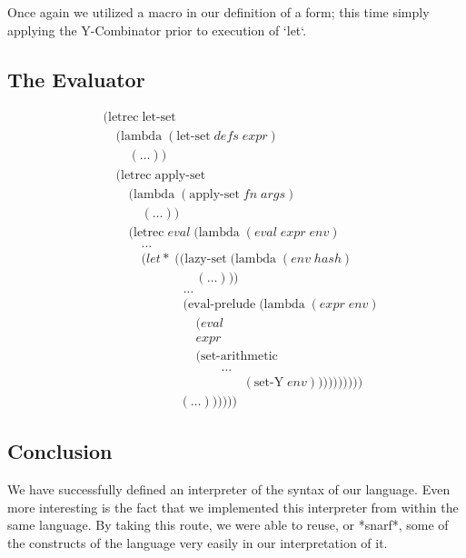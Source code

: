 Once again we utilized a macro in our definition of a form; this time simply
applying the Y-Combinator prior to execution of `let`.

\clearpage
\subsection{The Evaluator}
\begin{align*}
& (\text{letrec} \; \text{let-set} \; 
\\& \quad (\text{lambda} \; (\text{let-set} \; defs \; expr)
\\& \qquad (\dots))
\\& \quad (\text{letrec} \; \text{apply-set} \; 
\\& \qquad (\text{lambda} \; (\text{apply-set} \; fn \; args)
\\& \qquad \quad (\dots))
\\& \qquad (\text{letrec} \; eval \; (\text{lambda} \; (eval \; expr \; env)
\\& \qquad \quad \dots
\\& \qquad \quad (let* \; ((\text{lazy-set} \; (\text{lambda} \; (env \; hash)
\\& \qquad \qquad \qquad \quad \; (\dots)))
\\& \qquad \qquad \qquad \; \dots
\\& \qquad \qquad \qquad \; (\text{eval-prelude} \; (\text{lambda} \; (expr \; env)
\\& \qquad \qquad \qquad \quad \; (eval
\\& \qquad \qquad \qquad \quad \; expr
\\& \qquad \qquad \qquad \quad \; (\text{set-arithmetic}
\\& \qquad \qquad \qquad \qquad \quad \; \dots
\\& \qquad \qquad \qquad \qquad \qquad \quad (\text{set-Y} \; env))))))))))
\\& \qquad \qquad \qquad (\dots))))))
\end{align*}

\subsection{Conclusion}
We have successfully defined an interpreter of the syntax of our language.
Even more interesting is the fact that we implemented this interpreter from
within the same language. By taking this route, we were able to reuse, or
*snarf*, some of the constructs of the language very easily in our
interpretation of it.

